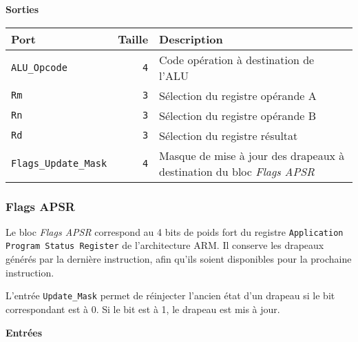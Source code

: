 \documentclass{article}
\begin{document}
    \vspace{1em}
    \textbf{Sorties}\\

    \begin{tabular}{|l|r|l|}
        \hline
        \textbf{Port}                 & \textbf{Taille} & \textbf{Description}                                                         \\
        \hline

        \texttt{ALU\_Opcode}        & \texttt{4}      & Code opération à destination de l'ALU                                        \\
        \hline
        \texttt{Rm}                & \texttt{3}      & Sélection du registre opérande A                                             \\
        \hline
        \texttt{Rn}                & \texttt{3}      & Sélection du registre opérande B                                             \\
        \hline
        \texttt{Rd}                & \texttt{3}      & Sélection du registre résultat                                               \\
        \hline
        \texttt{Flags\_Update\_Mask} & \texttt{4}      & Masque de mise à jour des drapeaux à destination du bloc \textit{Flags APSR} \\

        \hline
    \end{tabular}

    \subsubsection{Flags APSR}
    \label{sec:FlagsAPSR}


    Le bloc \textit{Flags APSR} correspond au 4 bits de poids fort du registre \texttt{Application Program Status Register} de l'architecture ARM. Il conserve les drapeaux générés par la dernière instruction, afin qu'ils soient disponibles pour la prochaine instruction.

    L'entrée \texttt{Update\_Mask} permet de réinjecter l'ancien état d'un drapeau si le bit correspondant est à 0.
    Si le bit est à 1, le drapeau est mis à jour.


    \textbf{Entrées}\\
\end{document}

